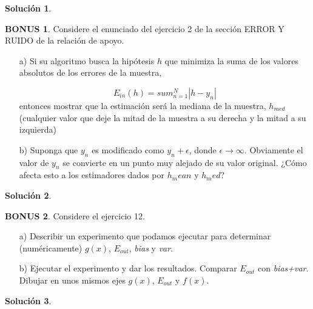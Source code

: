 \documentclass[a4paper, 11pt]{article}
\theoremstyle{definition}
\newtheorem*{solucion}{Solución}
\newtheorem*{bonus}{BONUS}
\begin{document}
  \begin{solucion}

  \end{solucion}


  \begin{bonus}
    Considere el enunciado del ejercicio 2 de la sección ERROR Y RUIDO de la relación de apoyo.
    \begin{itemize}
      \item[a)] Si su algoritmo busca la hipótesis $h$ que minimiza la suma de los valores absolutos de los errores de la muestra,

      \[
      E_{in}(h) = sum_{n=1}^N{|h-y_n|}
      \]
      entonces mostrar que la estimación será la mediana de la muestra, $h_{med}$ (cualquier valor que deje la mitad de la muestra a su derecha y la mitad a su izquierda)

      \item[b)] Suponga que $y_n$ es modificado como $y_n + \epsilon$, donde $\epsilon \rightarrow \infty$. Obviamente el valor de $y_n$ se convierte en un punto muy alejado de su valor original. ¿Cómo afecta esto a los estimadores dados por $h_mean$ y $h_med$?
    \end{itemize}
  \end{bonus}

  \begin{solucion}

  \end{solucion}

  \begin{bonus}
    Considere el ejercicio 12.
    \begin{itemize}
      \item[a)] Describir un experimento que podamos ejecutar para determinar (numéricamente) $g(x)$, $E_{out}$, \emph{bias} y \emph{var}.

      \item[b)] Ejecutar el experimento y dar los resultados. Comparar $E_{out}$ con \emph{bias+var}. Dibujar en unos mismos ejes $g(x)$, $E_{out}$ y $f(x)$.
    \end{itemize}
  \end{bonus}

  \begin{solucion}

  \end{solucion}
\end{document}
